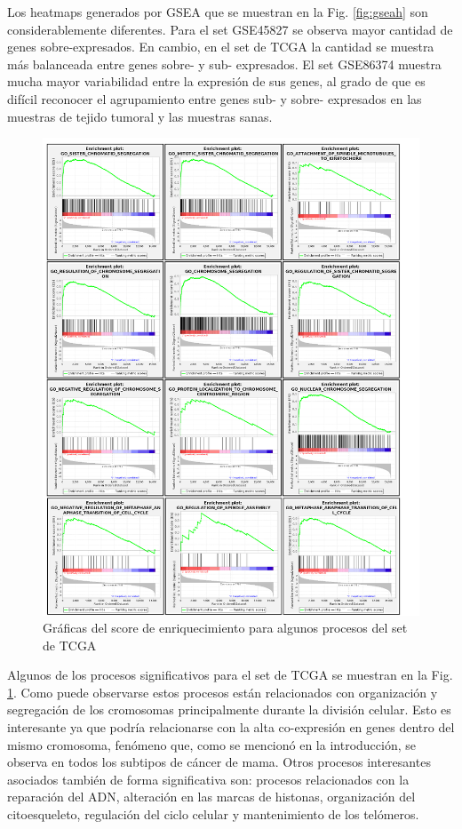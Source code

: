 \documentclass{article}
\begin{document}
Los heatmaps generados por GSEA que se muestran en la Fig. \ref{fig:gseah} son considerablemente diferentes. Para el set GSE45827 se observa mayor cantidad de genes sobre-expresados. En cambio, en el set de TCGA la cantidad se muestra más balanceada entre genes sobre- y sub- expresados. El set GSE86374 muestra mucha mayor variabilidad entre la expresión de sus genes, al grado de que es difícil reconocer el agrupamiento entre genes sub- y sobre- expresados en las muestras de tejido tumoral y las muestras sanas. \\

\begin{figure}[ht!]
\centering
\includegraphics[scale=0.5]{../figures/TCGA_gsea.png}
\caption{Gráficas del score de enriquecimiento para algunos procesos del set de TCGA}
\label{fig:tcgagsea}
\end{figure}

Algunos de los procesos significativos para el set de TCGA se muestran en la Fig. \ref{fig:tcgagsea}. Como puede observarse estos procesos están relacionados con organización y segregación de los cromosomas principalmente durante la división celular. Esto es interesante ya que podría relacionarse con la alta co-expresión en genes dentro del mismo cromosoma, fenómeno que, como se mencionó en la introducción, se observa en todos los subtipos de cáncer de mama. Otros procesos interesantes asociados también de forma significativa son: procesos relacionados con la reparación del ADN, alteración en las marcas de histonas, organización del citoesqueleto, regulación del ciclo celular y mantenimiento de los telómeros. 
\end{document}
